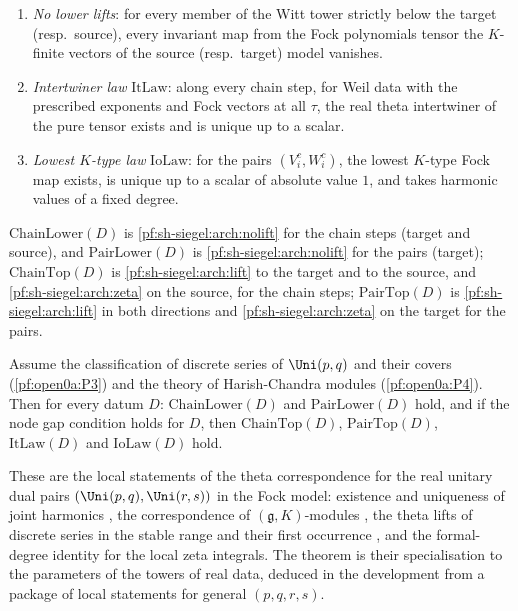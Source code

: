 \begin{definition}
\begin{enumerate}[label=(\alph*)]
$d$ is the formal degree of $M_W$ for the chosen measure.
\item\label{pf:sh-siegel:arch:nolift} \emph{No lower lifts}: for every member of the Witt tower strictly below the target
(resp.\ source), every invariant map from the Fock polynomials tensor the $K$-finite vectors of the source (resp.\ target)
model vanishes.
\item\label{pf:sh-siegel:arch:it} \emph{Intertwiner law} $\mathrm{ItLaw}$: along every chain step, for Weil data with
the prescribed exponents and Fock vectors at all $\tau$, the real theta intertwiner of the pure tensor exists and is unique
up to a scalar.
\item\label{pf:sh-siegel:arch:io} \emph{Lowest $K$-type law} $\mathrm{IoLaw}$: for the pairs $(V^c_i,W^c_i)$, the lowest
$K$-type Fock map exists, is unique up to a scalar of absolute value $1$, and takes harmonic values of a fixed degree.
\end{enumerate}
$\mathrm{ChainLower}(D)$ is \ref{pf:sh-siegel:arch:nolift} for the chain steps (target and source), and
$\mathrm{PairLower}(D)$ is \ref{pf:sh-siegel:arch:nolift} for the pairs (target); $\mathrm{ChainTop}(D)$ is
\ref{pf:sh-siegel:arch:lift} to the target and to the source, and \ref{pf:sh-siegel:arch:zeta} on the source, for the
chain steps; $\mathrm{PairTop}(D)$ is \ref{pf:sh-siegel:arch:lift} in both directions and \ref{pf:sh-siegel:arch:zeta} on
the target for the pairs.
\end{definition}
\begin{theorem}\label{pf:sh-siegel:arch}
Assume the classification of discrete series of $\Uni(p,q)$ and their covers \textup{(\ref{pf:open0a:P3})} and the
theory of Harish-Chandra modules \textup{(\ref{pf:open0a:P4})}. Then for every datum $D$: $\mathrm{ChainLower}(D)$ and
$\mathrm{PairLower}(D)$ hold, and if the node gap condition holds for $D$, then $\mathrm{ChainTop}(D)$, $\mathrm{PairTop}(D)$,
$\mathrm{ItLaw}(D)$ and $\mathrm{IoLaw}(D)$ hold.
\end{theorem}

These are the local statements of the theta correspondence for the real unitary dual pairs $(\Uni(p,q),\Uni(r,s))$ in
the Fock model: existence and uniqueness of joint harmonics \cite{KashiwaraVergne1978,Howe1989}, the correspondence of
$(\mathfrak g,K)$-modules \cite{Howe1989}, the theta lifts of discrete series in the stable range and their first
occurrence \cite{Li1990,Paul1998}, and the formal-degree identity for the local zeta integrals. The theorem is their
specialisation to the parameters of the towers of real data, deduced in the development from a package of local
statements for general $(p,q,r,s)$.

